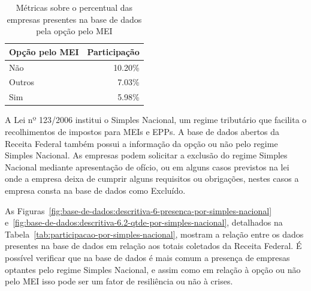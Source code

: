 \begin{table}[htb]
\centering
\caption{Métricas sobre o percentual das empresas presentes na base de dados pela opção pelo MEI}
\label{tab:participacao-por-mei}
\begin{tabular}{lr}
\toprule
Opção pelo MEI & Participação \\
\midrule
Não      &    10.20\% \\
Outros   &     7.03\% \\
Sim      &     5.98\% \\
\bottomrule
\end{tabular}
\fdadospesquisa
\end{table}

A Lei nº 123/2006 \cite{lei:123:lei-estatuto-mei-e-epp} institui o Simples Nacional, um regime tributário que facilita o recolhimentos de impostos para MEIs e EPPs. A base de dados abertos da Receita Federal também possui a informação da opção ou não pelo regime Simples Nacional. As empresas podem solicitar a exclusão do regime Simples Nacional mediante apresentação de ofício, ou em alguns casos previstos na lei onde a empresa deixa de cumprir alguns requisitos ou obrigações, nestes casos a empresa consta na base de dados como Excluído.

As Figuras~\ref{fig:base-de-dados:descritiva-6-presenca-por-simples-nacional} e~\ref{fig:base-de-dados:descritiva-6.2-qtde-por-simples-nacional}, detalhados na Tabela~\ref{tab:participacao-por-simples-nacional}, mostram a relação entre os dados presentes na base de dados em relação aos totais coletados da Receita Federal. É possível verificar que na base de dados é mais comum a presença de empresas optantes pelo regime Simples Nacional, e assim como em relação à opção ou não pelo MEI isso pode ser um fator de resiliência ou não à crises.

